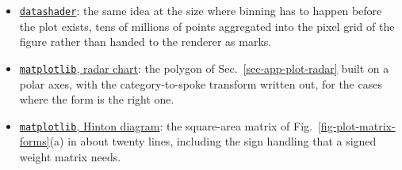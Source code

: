 \begin{itemize}
	\item \href{https://datashader.org/}{\texttt{datashader}}: the same idea at the size where binning has to happen before the plot exists, tens of millions of points aggregated into the pixel grid of the figure rather than handed to the renderer as marks.
	\item \href{https://matplotlib.org/stable/gallery/specialty_plots/radar_chart.html}{\texttt{matplotlib}, radar chart}: the polygon of Sec.~\ref{sec-app-plot-radar} built on a polar axes, with the category-to-spoke transform written out, for the cases where the form is the right one.
	\item \href{https://matplotlib.org/stable/gallery/specialty_plots/hinton_demo.html}{\texttt{matplotlib}, Hinton diagram}: the square-area matrix of Fig.~\ref{fig-plot-matrix-forms}(a) in about twenty lines, including the sign handling that a signed weight matrix needs.
\end{itemize}

